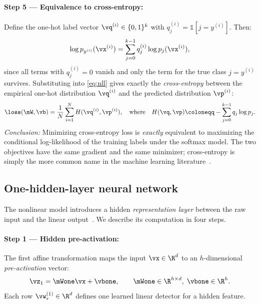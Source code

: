 \documentclass[sigconf,screen,nonacm]{acmart}
\begin{document}
\paragraph{Step 5 --- Equivalence to cross-entropy:}
Define the one-hot label vector $\vq^{(i)} \in \{0,1\}^k$ with $q^{(i)}_j = \mathbb{1}[j = y^{(i)}]$. Then:
\begin{equation}
    \log p_{y^{(i)}}(\vx^{(i)}) = \sum_{j=0}^{k-1} q^{(i)}_j \log p_j(\vx^{(i)}),
    \label{eq:xent-equiv}
\end{equation}
since all terms with $q^{(i)}_j = 0$ vanish and only the term for the true class $j = y^{(i)}$ survives. Substituting into \cref{eq:nll} gives exactly the \emph{cross-entropy} between the empirical one-hot distribution $\vq^{(i)}$ and the predicted distribution $\vp^{(i)}$:
\begin{equation}
    \loss(\mW, \vb) = \frac{1}{N}\sum_{i=1}^{N} H(\vq^{(i)}, \vp^{(i)}),
    \quad \text{where}\quad H(\vq, \vp) \coloneqq -\sum_{j=0}^{k-1} q_j \log p_j.
    \label{eq:xent-final}
\end{equation}
\emph{Conclusion:} Minimizing cross-entropy loss is \emph{exactly} equivalent to maximizing the conditional log-likelihood of the training labels under the softmax model. The two objectives have the same gradient and the same minimizer; cross-entropy is simply the more common name in the machine learning literature~\cite{goodfellow2016deep}.

\subsection{One-hidden-layer neural network}
\label{sec:nn-architecture}

The nonlinear model introduces a hidden \emph{representation layer} between the raw input and the linear output~\cite{goodfellow2016deep,cs231n_nn1}. We describe its computation in four steps.

\paragraph{Step 1 --- Hidden pre-activation:}
The first affine transformation maps the input $\vx \in \R^d$ to an $h$-dimensional \emph{pre-activation} vector:
\begin{equation}
    \vz_1 = \mWone \vx + \vbone, \qquad \mWone \in \R^{h \times d},\; \vbone \in \R^h.
    \label{eq:preact}
\end{equation}
Each row $\vw^{(1)}_r \in \R^d$ defines one learned linear detector for a hidden feature.
\end{document}
